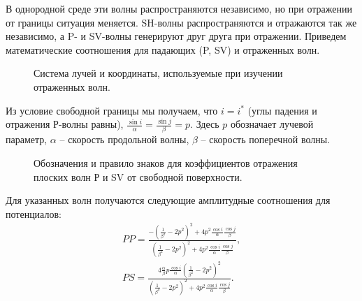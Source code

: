 В однородной среде эти волны распространяются независимо, но при отражении от границы ситуация меняется. SH-волны распространяются и отражаются так же независимо, а P- и SV-волны генерируют друг друга при отражении. Приведем математические соотношения для падающих (P, SV) и отраженных волн.

\begin{figure}[h]
\caption{Система лучей и координаты, используемые при изучении отраженных волн.}
\end{figure}

Из условие свободной границы мы получаем, что $i = i^*$ (углы падения и отражения Р-волны равны), $\frac{\sin{i}}{\alpha} = \frac{\sin{j}}{\beta} = p$. Здесь $p$ обозначает лучевой параметр, $\alpha$ – скорость продольной волны, $\beta$ – скорость поперечной волны. 

\begin{figure}[h]
\caption{Обозначения и правило знаков для коэффициентов отражения плоских волн Р и SV от свободной поверхности.}
\end{figure}

Для указанных волн получаются следующие амплитудные соотношения для потенциалов:
\begin{eqnarray}
PP = \frac{ -(\frac{1}{\beta^2} - 2p^2)^2 + 4p^2\frac{\cos{i}}{\alpha}\frac{\cos{j}}{\beta} }{ (\frac{1}{\beta^2} - 2p^2)^2 + 4p^2\frac{\cos{i}}{\alpha}\frac{\cos{j}}{\beta} }, \\
PS = \frac{ 4\frac{\alpha}{\beta}p\frac{\cos{i}}{\alpha}(\frac{1}{\beta^2} - 2p^2)^2 }{ (\frac{1}{\beta^2} - 2p^2)^2 + 4p^2\frac{\cos{i}}{\alpha}\frac{\cos{j}}{\beta} }.
\end{eqnarray}

